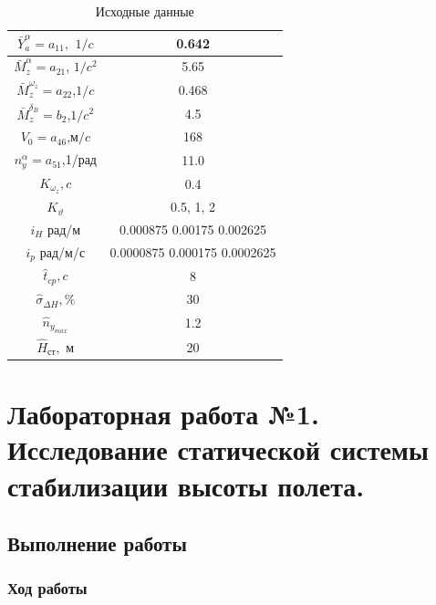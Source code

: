     \begin{table}[H]
        \centering
        \caption{Исходные данные}
        \label{tab:Исходные данные 2}
        \begin{tabular}{|c|c|}
            \hline
            $\bar{Y}_a^\alpha=a_{11},$ $1/c$ &  0.642  \\ \hline
            $\bar{M}_z^{\alpha}=a_{21}$, $1/c^2$ &   5.65 \\ \hline
            $\bar{M}_z^{\omega_z}=a_{22}$,$1/c$ &  0.468 \\ \hline
            $\bar{M}^{\delta_B}_z=b_2$,$1/c^2$ & 4.5  \\ \hline
            $V_0=a_{46}$,м$/c$ & 168 \\ \hline
            $n_y^\alpha=a_{51}$,1/рад &  11.0  \\ \hline
            $K_{\omega_z}, c$ & 0.4 \\ \hline
            $K_\vartheta$  & 0.5, 1, 2  \\ \hline
            $i_H$ рад/м & 0.000875 0.00175 0.002625 \\ \hline
            $i_p$ рад/м/с & 0.0000875 0.000175 0.0002625 \\ \hline
            $\hat{t}_{cp},c$ & 8 \\ \hline
            $\hat{\sigma}_{\Delta H}, \%$ & 30 \\ \hline
            $\hat{n}_{y_{max}}$ & 1.2 \\ \hline
            $\hat{H}_{\text{ст}},$ м & 20 \\ \hline
            \end{tabular}
    \end{table}

\section{Лабораторная работа №1. Исследование статической системы стабилизации высоты полета.}
\subsection{Выполнение работы}
    \subsubsection{Ход работы}
    
